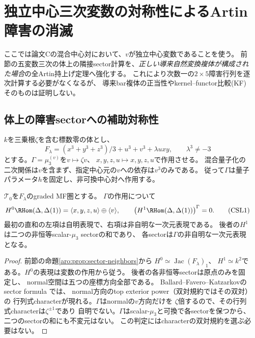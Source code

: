 \section{独立中心三次変数の対称性によるArtin障害の消滅}
\label{csl:sec:symmetry}

ここでは論文Cの混合中心対において、$v$が独立中心変数であることを使う。
前節の五変数三次の体上の隣接sector計算を、\emph{正しい導来自然変換複体が構成された場合}の全Artin持上げ定理へ強化する。
これにより次数一の$2\times5$障害行列を逐次計算する必要がなくなるが、
導来bar複体の正当性やkernel--functor比較(KF)そのものは証明しない。

\subsection{体上の障害sectorへの補助対称性}
$k$を三乗根$\zeta$を含む標数零の体とし、
\[
 F_\lambda=(x^3+y^3+z^3)/3+u^3+v^3+\lambda uxy,
 \qquad \lambda^3\ne-3
\]
とする。$\Gamma=\mu_3^{(v)}$を$v\mapsto\zeta v$、
$x,y,z,u\mapsto x,y,z,u$で作用させる。
混合量子化の二次関係は$v$を含まず、指定中心元の$v$への依存は$v^3$のみである。
従って$\Gamma$は量子パラメータ$h$を固定し、非可換中心対へ作用する。

\begin{proposition}
\label{csl:prop:characters}
$\mathcal T_0$を$F_\lambda$のgraded MF圏とする。
$\Gamma$の作用について
\[
 H^0\RHom(\Delta,\Delta(1))
 =\langle x,y,z,u\rangle\oplus\langle v\rangle,
 \qquad
 \left(H^1\RHom(\Delta,\Delta(1))\right)^\Gamma=0.
 \tag{CSL1}\label{csl:eq:characters}
\]
最初の直和の左項は自明表現で、右項は非自明な一次元表現である。
後者の$H^1$は二つの非恒等scalar-$\mu_3$ sectorの和であり、
各sectorは$\Gamma$の非自明な一次元表現となる。
\end{proposition}
\begin{proof}
前節の命題\ref{aro:prop:sector-neighbors}から
$H^0\simeq\operatorname{Jac}(F_\lambda)_1$、
$H^1\simeq k^2$である。$H^0$の表現は変数の作用から従う。
後者の各非恒等sectorは原点のみを固定し、
normal空間は五つの座標方向全部である。
Ballard--Favero--Katzarkovのsector formula
\cite[Theorem~5.39, proof]{AROBFK}では、
normal方向のtop exterior power（双対規約ではその双対）の
行列式characterが現れる。$\Gamma$はnormalの$v$方向だけを
$\zeta$倍するので、その行列式characterは$\zeta^{\pm1}$であり
自明でない。$\Gamma$はscalar-$\mu_3$と可換で各sectorを保つから、
二つのsectorの和にも不変元はない。
この判定にはcharacterの双対規約を選ぶ必要はない。
\end{proof}

